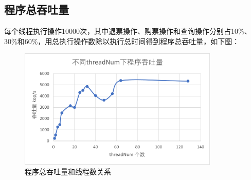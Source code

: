 \documentclass{article}
\begin{document}
\subsection{程序总吞吐量}
每个线程执行操作10000次，其中退票操作、购票操作和查询操作分别占10\%、30\%和60\%，用总执行操作数除以执行总时间得到程序总吞吐量，如下图：\par 
\begin{figure}[H]
    \centering
    \includegraphics[width = 0.85\textwidth]{5.png}
    \caption{程序总吞吐量和线程数关系}
\end{figure}\par
\end{document}
